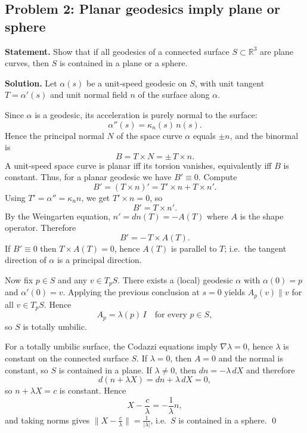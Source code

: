 \documentclass[12pt,a4paper]{article}
\theoremstyle{plain}
\theoremstyle{definition}      %
\begin{document}
	
\subsection*{Problem 2: Planar geodesics imply plane or sphere}
\textbf{Statement.} Show that if all geodesics of a connected surface $S\subset\mathbb{R}^3$ are plane curves, then
$S$ is contained in a plane or a sphere.

	
	\bigskip
	\textbf{Solution.}
	Let $\alpha(s)$ be a unit-speed geodesic on $S$, with unit tangent $T=\alpha'(s)$ and unit normal field $n$ of the
	surface along $\alpha$.
	
	Since $\alpha$ is a geodesic, its acceleration is purely normal to the surface:
	\[
	\alpha''(s)=\kappa_n(s)\,n(s).
	\]
	Hence the principal normal $N$ of the space curve $\alpha$ equals $\pm n$, and the binormal is
	\[
	B = T\times N = \pm\, T\times n.
	\]
	A unit-speed space curve is planar iff its torsion vanishes, equivalently iff $B$ is constant. Thus, for a planar
	geodesic we have $B'\equiv 0$. Compute
	\[
	B' = (T\times n)' = T'\times n + T\times n'.
	\]
	Using $T'=\alpha''=\kappa_n n$, we get $T'\times n=0$, so
	\[
	B' = T\times n'.
	\]
	By the Weingarten equation, $n' = dn(T) = -A(T)$ where $A$ is the shape operator. Therefore
	\[
	B' = -\,T\times A(T).
	\]
	If $B'\equiv 0$ then $T\times A(T)=0$, hence $A(T)$ is parallel to $T$; i.e.\ the tangent direction of $\alpha$ is a
	principal direction.
	
	Now fix $p\in S$ and any $v\in T_pS$. There exists a (local) geodesic $\alpha$ with $\alpha(0)=p$ and $\alpha'(0)=v$.
	Applying the previous conclusion at $s=0$ yields $A_p(v)\parallel v$ for all $v\in T_pS$. Hence
	\[
	A_p = \lambda(p)\,I \quad\text{for every }p\in S,
	\]
	so $S$ is totally umbilic.
	
	For a totally umbilic surface, the Codazzi equations imply $\nabla \lambda = 0$, hence $\lambda$ is constant on the
	connected surface $S$.
	If $\lambda=0$, then $A=0$ and the normal is constant, so $S$ is contained in a plane.
	If $\lambda\neq 0$, then $dn = -\lambda\,dX$ and therefore
	\[
	d(n+\lambda X)=dn+\lambda\,dX=0,
	\]
	so $n+\lambda X=c$ is constant. Hence
	\[
	X-\frac{c}{\lambda} = -\frac{1}{\lambda}n,
	\]
	and taking norms gives $\bigl\|X-\frac{c}{\lambda}\bigr\|=\frac{1}{|\lambda|}$, i.e.\ $S$ is contained in a sphere.
	\qed
	
\end{document}
